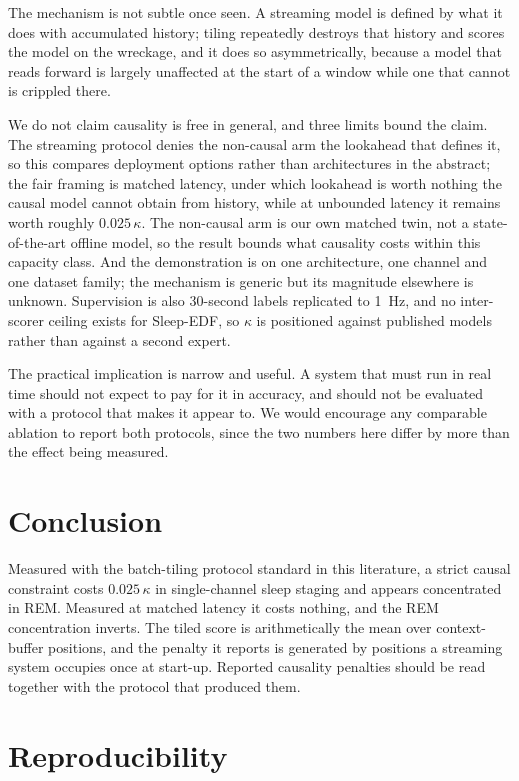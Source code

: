 \documentclass[conference]{IEEEtran}
\begin{document}
The mechanism is not subtle once seen. A streaming model is defined by what it does with accumulated
history; tiling repeatedly destroys that history and scores the model on the wreckage, and it does so
asymmetrically, because a model that reads forward is largely unaffected at the start of a window
while one that cannot is crippled there.

We do not claim causality is free in general, and three limits bound the claim. The streaming protocol
denies the non-causal arm the lookahead that defines it, so this compares deployment options rather
than architectures in the abstract; the fair framing is matched latency, under which lookahead is
worth nothing the causal model cannot obtain from history, while at unbounded latency it remains worth
roughly $0.025\,\kappa$. The non-causal arm is our own matched twin, not a state-of-the-art offline
model, so the result bounds what causality costs within this capacity class. And the demonstration is
on one architecture, one channel and one dataset family; the mechanism is generic but its magnitude
elsewhere is unknown. Supervision is also 30-second labels replicated to 1~Hz, and no inter-scorer
ceiling exists for Sleep-EDF, so $\kappa$ is positioned against published models rather than against a
second expert.

The practical implication is narrow and useful. A system that must run in real time should not expect
to pay for it in accuracy, and should not be evaluated with a protocol that makes it appear to. We
would encourage any comparable ablation to report both protocols, since the two numbers here differ by
more than the effect being measured.

\section{Conclusion}

Measured with the batch-tiling protocol standard in this literature, a strict causal constraint costs
$0.025\,\kappa$ in single-channel sleep staging and appears concentrated in REM. Measured at matched
latency it costs nothing, and the REM concentration inverts. The tiled score is arithmetically the mean
over context-buffer positions, and the penalty it reports is generated by positions a streaming system
occupies once at start-up. Reported causality penalties should be read together with the protocol that
produced them.

\section*{Reproducibility}
\end{document}
